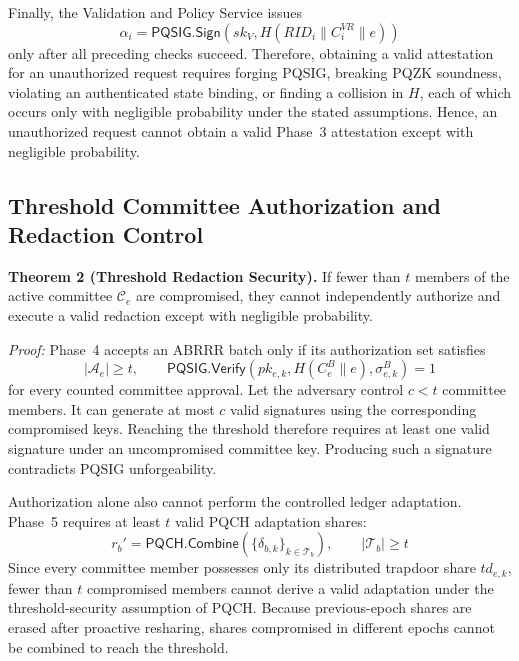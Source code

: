 \documentclass[lettersize,journal]{IEEEtran}
\begin{document}
    Finally, the Validation and Policy Service issues
    \begin{equation}
    { \alpha_i=
    \mathsf{PQSIG.Sign}
    \left(
    sk_V,H(RID_i\parallel C_i^{VR}\parallel e)
    \right)}
    \label{eq:sec_validation_att}
    \end{equation}
    only after all preceding checks succeed. Therefore, obtaining a valid
    attestation for an unauthorized request requires forging PQSIG,
    breaking PQZK soundness, violating an authenticated state binding, or
    finding a collision in $H$, each of which occurs only with negligible
    probability under the stated assumptions. Hence, an unauthorized
    request cannot obtain a valid Phase~3 attestation except with
    negligible probability.
     
    
    
    \subsection{Threshold Committee Authorization and Redaction Control}
    
    \textbf{Theorem 2 (Threshold Redaction Security).}
    If fewer than $t$ members of the active committee $\mathcal{C}_e$ are compromised, they cannot independently authorize and execute a valid redaction except with negligible probability.
    
    \emph{Proof:}
    Phase~4 accepts an ABRRR batch only if its authorization set satisfies
    \begin{equation}
    |\mathcal{A}_e|\geq t,
    \qquad
    \mathsf{PQSIG.Verify}
    (pk_{e,k},H(C_e^B\parallel e),\sigma_{e,k}^{B})=1
    \label{eq:sec_committee}
    \end{equation}
    for every counted committee approval. Let the adversary control
    $c<t$ committee members. It can generate at most $c$ valid signatures using the corresponding compromised keys. Reaching the threshold therefore requires at least one valid signature under an uncompromised
    committee key. Producing such a signature contradicts PQSIG
    unforgeability.
    
    Authorization alone also cannot perform the controlled ledger
    adaptation. Phase~5 requires at least $t$ valid PQCH adaptation shares:
    \begin{equation}
    r_b'=
    \mathsf{PQCH.Combine}
    \left(
    \{\delta_{b,k}\}_{k\in\mathcal{T}_b}
    \right),
    \qquad |\mathcal{T}_b|\geq t
    \label{eq:sec_pqch_threshold}
    \end{equation}
    Since every committee member possesses only its distributed trapdoor share $td_{e,k}$, fewer than $t$ compromised members cannot derive a valid adaptation under the threshold-security assumption of PQCH.  {Because previous-epoch shares are erased after proactive resharing, shares compromised in different epochs cannot be combined to reach the threshold.}
    
\end{document}
